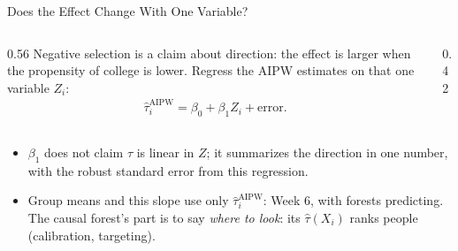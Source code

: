 \documentclass[aspectratio=169,11pt,xcolor=dvipsnames]{beamer}
\begin{document}
\begin{frame}{Does the Effect Change With One Variable?}
\begin{columns}[c]
\begin{column}{0.56\linewidth}
Negative selection is a claim about direction: the effect is larger when the propensity
of college is lower. Regress the AIPW estimates on that one variable $Z_i$:
\begin{align*}
  \hat\tau_i^{\text{AIPW}} = \beta_0 + \beta_1 Z_i + \text{error} .
\end{align*}
\end{column}
\begin{column}{0.42\linewidth}
\begin{center}
\end{center}
\end{column}
\end{columns}
\vskip4pt
\begin{itemize}\itemsep4pt
  \item $\beta_1$ does not claim $\tau$ is linear in $Z$; it summarizes the direction in one number, with the
        robust standard error from this regression.
  \item Group means and this slope use only $\hat\tau_i^{\text{AIPW}}$: Week 6, with forests predicting. The causal
        forest's part is to say \emph{where to look}: its $\hat\tau(X_i)$ ranks people (calibration, targeting).
\end{itemize}
\end{frame}
\end{document}
